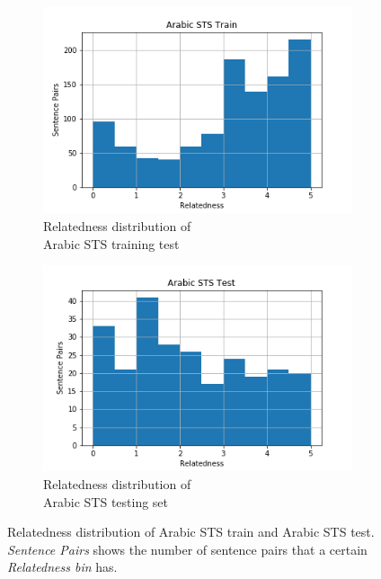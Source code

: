 \begin{enumerate}
\begin{figure}
	\captionsetup[subfigure]{justification=centering}
	\centering
	\begin{subfigure}[b]{.5\textwidth}
		\centering
		\includegraphics[width=\textwidth]{figures/semantic_textual_similarity/introduction/sts_arabic_train.png}
		\caption{Relatedness distribution of \\ Arabic STS  training test}
		\label{fig:arabic_train_relatedness}
	\end{subfigure}%
	\begin{subfigure}[b]{.5\textwidth}
		\centering
		\includegraphics[width=\textwidth]{figures/semantic_textual_similarity/introduction/sts_arabic_test.png}
		\caption{Relatedness distribution of \\ Arabic STS  testing set}
		\label{fig:arabic_test_relatedness}
	\end{subfigure}
	\caption[Relatedness distribution of Arabic STS train and Arabic STS test]{Relatedness distribution of Arabic STS train and Arabic STS test. \textit{Sentence Pairs} shows the number of sentence pairs that a certain \textit{Relatedness bin} has.}
	\label{fig:arabic_sts_relatedness}
\end{figure}



\end{enumerate}
